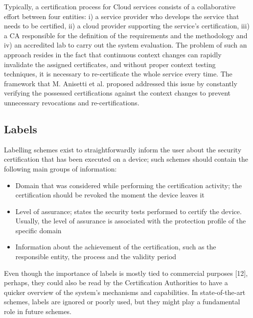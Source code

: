 Typically, a certification process for Cloud services consists of a collaborative effort between four entities: i) a service provider who develops the service that needs to be certified, ii) a cloud provider supporting the service's certification, iii) a CA responsible for the definition of the requirements and the methodology and iv) an accredited lab to carry out the system evaluation. The problem of such an approach resides in the fact that continuous context changes can rapidly invalidate the assigned certificates, and without proper context testing techniques, it is necessary to re-certificate the whole service every time. The framework that M. Anisetti et al. proposed addressed this issue by constantly verifying the possessed certifications against the context changes to prevent unnecessary revocations and re-certifications.


\subsection{Labels}
Labelling schemes exist to straightforwardly inform the user about the security certification that has been executed on a device; such schemes should contain the following main groups of information:

\begin{itemize}
    \item Domain that was considered while performing the certification activity; the certification should be revoked the moment the device leaves it

    \item Level of assurance; states the security tests performed to certify the device. Usually, the level of assurance is associated with the protection profile of the specific domain

    \item  Information about the achievement of the certification, such as the responsible entity, the process and the validity period

\end{itemize}

Even though the importance of labels is mostly tied to commercial purposes [12], perhaps, they could also be read by the Certification Authorities to have a quicker overview of the system's mechanisms and capabilities. In state-of-the-art schemes, labels are ignored or poorly used, but they might play a fundamental role in future schemes.



